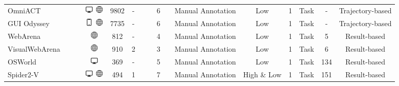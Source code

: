 \documentclass[letterpaper]{article} %
\newcommand{\tick}{\textcolor{green}{\ding{51}}}
\newcommand{\cross}{\textcolor{red}{\ding{55}}}
\begin{document}
\begin{table}[h!]
{\begin{tabular}{l|ccc|cccccccc|cccc}
 OmniACT~\cite{omniact} & \cross & \cross & \includegraphics[width=0.4cm]{image/desktop.png} \includegraphics[width=0.4cm]{image/web.png} & 9802 & - & \cross & \cross & 6 & \tick & Manual Annotation & Low & 1 & Task & - & Trajectory-based \\
 GUI Odyssey~\cite{gui-odyssey} & \cross & \cross & \includegraphics[width=0.4cm]{image/mobile.png} \includegraphics[width=0.4cm]{image/web.png} & 7735 & - & \cross & \cross & 6 & \tick & Manual Annotation & Low & 1 & Task & - & Trajectory-based \\ \hline
 WebArena~\cite{webarena} & \tick & \cross & \includegraphics[width=0.4cm]{image/web.png} & 812 & - & \cross & \cross & 4 & \cross & Manual Annotation & Low & 1 & Task & 5 & Result-based \\
 VisualWebArena~\cite{visualwebarena} & \tick & \cross & \includegraphics[width=0.4cm]{image/web.png} & 910 & 2 & \cross & \cross & 3 & \cross & Manual Annotation & Low & 1 & Task & 6 & Result-based \\ 
 OSWorld~\cite{osworld} & \tick & \tick & \includegraphics[width=0.4cm]{image/desktop.png} & 369 & - & \cross & \cross & 5 & \tick & Manual Annotation & Low & 1 & Task & 134 & Result-based \\
 Spider2-V~\cite{spider2-v} & \tick & \tick & \includegraphics[width=0.4cm]{image/desktop.png} \includegraphics[width=0.4cm]{image/web.png} & 494 & 1 & \cross & \cross & 7 & \cross & Manual Annotation & High \& Low & 1 & Task & 151 & Result-based \\ 

\end{tabular}}
\end{table}
\end{document}
